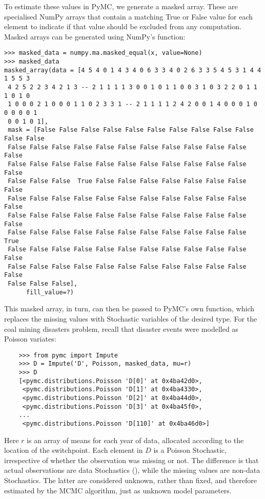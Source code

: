 To estimate these values in PyMC, we generate a masked array. These are specialised NumPy arrays that contain a matching True or False value for each element to indicate if that value should be excluded from any computation. Masked arrays can be generated using NumPy's  function:
\begin{verbatim}
>>> masked_data = numpy.ma.masked_equal(x, value=None)
>>> masked_data
masked_array(data = [4 5 4 0 1 4 3 4 0 6 3 3 4 0 2 6 3 3 5 4 5 3 1 4 4 1 5 5 3
 4 2 5 2 2 3 4 2 1 3 -- 2 1 1 1 1 3 0 0 1 0 1 1 0 0 3 1 0 3 2 2 0 1 1 1 0 1 0
 1 0 0 0 2 1 0 0 0 1 1 0 2 3 3 1 -- 2 1 1 1 1 2 4 2 0 0 1 4 0 0 0 1 0 0 0 0 0 1
 0 0 1 0 1],
 mask = [False False False False False False False False False False False False
 False False False False False False False False False False False False
 False False False False False False False False False False False False
 False False False  True False False False False False False False False
 False False False False False False False False False False False False
 False False False False False False False False False False False False
 False False False False False False False False False False False  True
 False False False False False False False False False False False False
 False False False False False False False False False False False False
 False False False],
      fill_value=?)

\end{verbatim}

This masked array, in turn, can then be passed to PyMC's own  function, which replaces the missing values with Stochastic variables of the desired type. For the coal mining disasters problem, recall that disaster events were modelled as Poisson variates:

\begin{verbatim}
	>>> from pymc import Impute
	>>> D = Impute('D', Poisson, masked_data, mu=r)
	>>> D
	[<pymc.distributions.Poisson 'D[0]' at 0x4ba42d0>,
	 <pymc.distributions.Poisson 'D[1]' at 0x4ba4330>,
	 <pymc.distributions.Poisson 'D[2]' at 0x4ba44d0>,
	 <pymc.distributions.Poisson 'D[3]' at 0x4ba45f0>,
	...
	 <pymc.distributions.Poisson 'D[110]' at 0x4ba46d0>]
\end{verbatim}

Here $r$ is an array of means for each year of data, allocated according to the location of the switchpoint. Each element in $D$ is a Poisson Stochastic, irrespective of whether the observation was missing or not. The difference is that actual observations are data Stochastics (), while the missing values are non-data Stochastics. The latter are considered unknown, rather than fixed, and therefore estimated by the MCMC algorithm, just as unknown model parameters.

